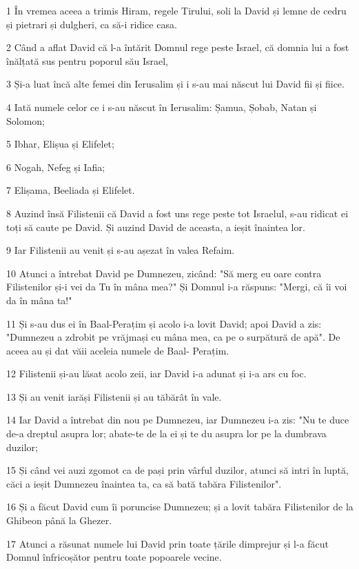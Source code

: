 \par 1 În vremea aceea a trimis Hiram, regele Tirului, soli la David și lemne de cedru și pietrari și dulgheri, ca să-i ridice casa.
\par 2 Când a aflat David că l-a întărit Domnul rege peste Israel, că domnia lui a fost înălțată sus pentru poporul său Israel,
\par 3 Și-a luat încă alte femei din Ierusalim și i s-au mai născut lui David fii și fiice.
\par 4 Iată numele celor ce i s-au născut în Ierusalim: Șamua, Șobab, Natan și Solomon;
\par 5 Ibhar, Elișua și Elifelet;
\par 6 Nogah, Nefeg și Iafia;
\par 7 Elișama, Beeliada și Elifelet.
\par 8 Auzind însă Filistenii că David a fost uns rege peste tot Israelul, s-au ridicat ei toți să caute pe David. Și auzind David de aceasta, a ieșit înaintea lor.
\par 9 Iar Filistenii au venit și s-au așezat în valea Refaim.
\par 10 Atunci a întrebat David pe Dumnezeu, zicând: "Să merg eu oare contra Filistenilor și-i vei da Tu în mâna mea?" Și Domnul i-a răspuns: "Mergi, că îi voi da în mâna ta!"
\par 11 Și s-au dus ei în Baal-Perațim și acolo i-a lovit David; apoi David a zis: "Dumnezeu a zdrobit pe vrăjmași cu mâna mea, ca pe o surpătură de apă". De aceea au și dat văii aceleia numele de Baal- Perațim.
\par 12 Filistenii și-au lăsat acolo zeii, iar David i-a adunat și i-a ars cu foc.
\par 13 Și au venit iarăși Filistenii și au tăbărât în vale.
\par 14 Iar David a întrebat din nou pe Dumnezeu, iar Dumnezeu i-a zis: "Nu te duce de-a dreptul asupra lor; abate-te de la ei și te du asupra lor pe la dumbrava duzilor;
\par 15 Și când vei auzi zgomot ca de pași prin vârful duzilor, atunci să intri în luptă, căci a ieșit Dumnezeu înaintea ta, ca să bată tabăra Filistenilor".
\par 16 Și a făcut David cum îi poruncise Dumnezeu; și a lovit tabăra Filistenilor de la Ghibeon până la Ghezer.
\par 17 Atunci a răsunat numele lui David prin toate țările dimprejur și l-a făcut Domnul înfricoșător pentru toate popoarele vecine.


